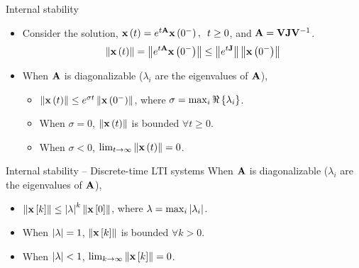 \documentclass[aspectratio=169]{beamer}
\let\olditem\item
\renewcommand{\item}{\setlength{\itemsep}{\fill}\olditem}
\def\mf{\ensuremath\mathbf}
\def\lp{\ensuremath\left(}
\def\rp{\ensuremath\right)}
\def\lv{\ensuremath\left\lvert}
\def\rv{\ensuremath\right\rvert}
\def\lV{\ensuremath\left\lVert}
\def\rV{\ensuremath\right\rVert}
\def\lc{\ensuremath\left\{}
\def\rc{\ensuremath\right\}}
\def\ls{\ensuremath\left[}
\def\rs{\ensuremath\right]}
\newcommand{\ct}[1]{\lp #1\rp}
\newcommand{\dt}[1]{\ls #1\rs}
\begin{document}
\begin{frame}[t]{Internal stability}
\begin{itemize}
    \item Consider the solution, $\mf{x}\ct{t} = e^{t\mf{A}}\mf{x}\ct{0^-}, \,\,\, t \geq 0$, and $\mf{A} = \mf{V}\mf{J}\mf{V}^{-1}$.
    \[ \lV \mf{x}\ct{t} \rV = \lV e^{t\mf{A}}\mf{x}\ct{0^-} \rV \leq \lV e^{t\mf{J}} \rV \lV \mf{x}\ct{0^-} \rV\]

    \item When $\mf{A}$ is diagonalizable ($\lambda_i$ are the eigenvalues of $\mf{A}$),
    \begin{itemize}
        \item $ \lV \mf{x}\ct{t} \rV \leq  e^{\sigma t} \lV \mf{x}\ct{0^-} \rV$, where $\sigma = \max_i \Re \lc \lambda_i \rc$.
        \item When $\sigma = 0$, $\lV \mf{x}\ct{t}\rV$ is bounded $\forall t \geq 0$.
        \item When $\sigma < 0$, $\lim_{t \to \infty} \lV \mf{x}\ct{t}\rV = 0$.
    \end{itemize}\vspace{0.2cm}
\end{itemize}
\end{frame}


\begin{frame}[t]{Internal stability -- Discrete-time LTI systems}
When $\mf{A}$ is diagonalizable ($\lambda_i$ are the eigenvalues of $\mf{A}$),
\begin{itemize}
    \item $\lV \mf{x}\dt{k} \rV \leq  \lv \lambda \rv^k \lV \mf{x}\dt{0} \rV$, where $\lambda = \max_i \lv \lambda_i \rv$.
    \item When $\lv \lambda \rv = 1$, $\lV \mf{x}\dt{k}\rV$ is bounded $\forall k > 0$.
    \item When $\lv \lambda \rv < 1$, $\lim_{k \to \infty} \lV \mf{x}\dt{k}\rV = 0$.
\end{itemize}
\end{frame}
    
    
\end{document}
